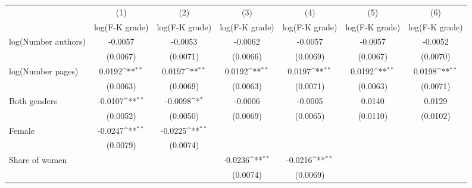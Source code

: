 {
\def\sym#1{\ifmmode^{#1}\else\(^{#1}\)\fi}
\begin{tabular}{l*{6}{c}}
\hline\hline
                    &\multicolumn{1}{c}{(1)}&\multicolumn{1}{c}{(2)}&\multicolumn{1}{c}{(3)}&\multicolumn{1}{c}{(4)}&\multicolumn{1}{c}{(5)}&\multicolumn{1}{c}{(6)}\\
                    &\multicolumn{1}{c}{log(F-K grade)}&\multicolumn{1}{c}{log(F-K grade)}&\multicolumn{1}{c}{log(F-K grade)}&\multicolumn{1}{c}{log(F-K grade)}&\multicolumn{1}{c}{log(F-K grade)}&\multicolumn{1}{c}{log(F-K grade)}\\
\hline
\hspace{3mm}log(Number authors)&     -0.0057        &     -0.0053        &     -0.0062        &     -0.0057        &     -0.0057        &     -0.0052        \\
                    &    (0.0067)        &    (0.0071)        &    (0.0066)        &    (0.0069)        &    (0.0067)        &    (0.0070)        \\
[1em]
\hspace{3mm}log(Number pages)&      0.0192\sym{**}&      0.0197\sym{**}&      0.0192\sym{**}&      0.0197\sym{**}&      0.0192\sym{**}&      0.0198\sym{**}\\
                    &    (0.0063)        &    (0.0069)        &    (0.0063)        &    (0.0071)        &    (0.0063)        &    (0.0071)        \\
[1em]
\hspace{3mm}Both genders&     -0.0107\sym{**}&     -0.0098\sym{*} &     -0.0006        &     -0.0005        &      0.0140        &      0.0129        \\
                    &    (0.0052)        &    (0.0050)        &    (0.0069)        &    (0.0065)        &    (0.0110)        &    (0.0102)        \\
[1em]
\hspace{3mm}Female  &     -0.0247\sym{**}&     -0.0225\sym{**}&                    &                    &                    &                    \\
                    &    (0.0079)        &    (0.0074)        &                    &                    &                    &                    \\
[1em]
\hspace{3mm}Share of women&                    &                    &     -0.0236\sym{**}&     -0.0216\sym{**}&                    &                    \\
                    &                    &                    &    (0.0074)        &    (0.0069)        &                    &                    \\

\end{tabular}}
